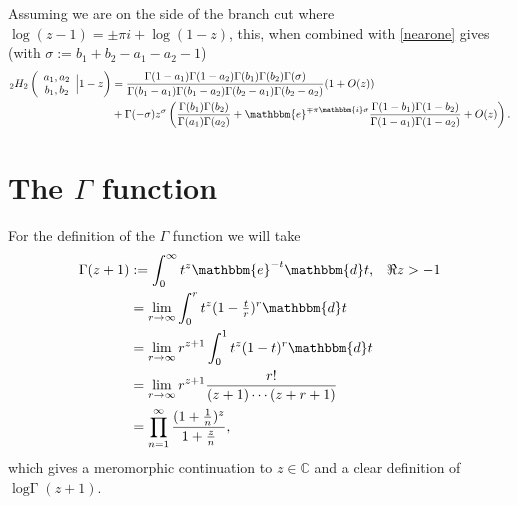 \documentclass[12pt]{article}
\newcommand{\logG} {\operatorname {log \Gamma}}
\newcommand{\ee}[0] {\mathbbm{e}}
\newcommand{\ii}[0] {\mathbbm{i}}
\newcommand{\dd}[0] {\mathbbm{d}}
\numberwithin{equation}{section}
\newcommand{\FF}[6] {{}_{#1}{#2}_{#3} \left( \begin{array}{c} #4 \\ #5 \end{array} \Big| {#6}  \right)}
\begin{document}
Assuming we are on the side of the branch cut where $\log(z-1) = \pm \pi i + \log(1-z)$, this, when combined with \eqref{nearone} gives (with $\sigma := b_1+b_2-a_1-a_2-1$)
\begin{align*}
\FF{2}{H}{2}{a_1,a_2}{b_1,b_2}{1-z} &= \frac{\Gamma(1-a_1)\Gamma(1-a_2)\Gamma(b_1)\Gamma(b_2)\Gamma(\sigma)}{\Gamma(b_1-a_1)\Gamma(b_1-a_2)\Gamma(b_2-a_1)\Gamma(b_2-a_2)}(1 + O(z))\\
&+ \Gamma(-\sigma) z^{\sigma} \left(\frac{\Gamma(b_1)\Gamma(b_2)}{\Gamma(a_1)\Gamma(a_2)} + \ee^{\mp \pi \ii \sigma} \frac{\Gamma(1-b_1)\Gamma(1-b_2)}{\Gamma(1-a_1)\Gamma(1-a_2)} + O(z)\right)\text{.}
\end{align*}


\section{The $\Gamma$ function}
For the definition of the $\Gamma$ function we will take
\begin{align*}
\Gamma(z+1) &:= \int_0^{\infty} t^z \ee^{-t} \dd t\text{,} \quad \Re z > -1\\
&= \lim_{r \to \infty} \int_0^{r} t^z (1-\tfrac{t}{r})^r \dd t \\
&= \lim_{r \to \infty} r^{z+1} \int_{0}^{1} t^z (1-t)^r \dd t \\
&= \lim_{r \to \infty} r^{z+1} \frac{r!}{(z+1) \cdots (z+r+1)} \\
&= \prod_{n=1} ^{\infty} \frac{(1+\frac{1}{n})^z}{1+\frac{z}{n}}\text{,}
\end{align*}
which gives a meromorphic continuation to $z \in \mathbb{C}$ and a clear definition of $\logG(z+1)$.
\end{document}
